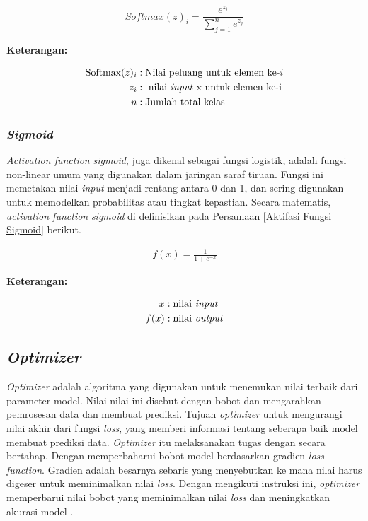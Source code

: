         \begin{equation}
            Softmax(z)_i= \frac{e^{z_i}}{\sum_{j=1}^{n} e^{z_j}}
        \end{equation}

     \textbf{Keterangan:}
        

        \begin{align*}
            \text{Softmax}(z)_i &: \text{Nilai peluang untuk elemen ke-}i \\
            z_i &: \text{ nilai \textit{input} x untuk elemen ke-i} \\
            n &: \text{Jumlah total kelas}
        \end{align*}
        



\subsubsection{\textit{Sigmoid}}
    \textit{Activation function} \textit{sigmoid}, juga dikenal sebagai fungsi logistik, adalah fungsi non-linear umum yang digunakan dalam jaringan saraf tiruan. Fungsi ini memetakan nilai \textit{input} menjadi rentang antara 0 dan 1, dan sering digunakan untuk memodelkan probabilitas atau tingkat kepastian. Secara matematis, \textit{activation function} \textit{sigmoid} di definisikan pada Persamaan  \ref{Aktifasi Fungsi Sigmoid} berikut.

    \begin{equation}
        \begin{aligned}
            f(x) = \frac{1}{1 + e^{-x}}
        \end{aligned}\label{Aktifasi Fungsi Sigmoid}
    \end{equation}

     \textbf{Keterangan:}
     
        \begin{align*}
        x & : \text{nilai \textit{input}} \\
        f(x) & :\text{nilai \textit{output}} 
        \end{align*}

        


\subsection{\textit{Optimizer}}

\textit{Optimizer} adalah algoritma yang digunakan untuk menemukan nilai terbaik dari parameter model. Nilai-nilai ini disebut dengan bobot dan mengarahkan pemrosesan data dan membuat prediksi. Tujuan \textit{optimizer} untuk mengurangi nilai akhir dari fungsi \textit{loss}, yang memberi informasi tentang seberapa baik model membuat prediksi data. \textit{Optimizer} itu melaksanakan tugas dengan secara bertahap. Dengan memperbaharui bobot model berdasarkan gradien \textit{loss function}. Gradien adalah besarnya sebaris yang menyebutkan ke mana nilai harus digeser untuk meminimalkan nilai \textit{loss}. Dengan mengikuti instruksi ini, \textit{optimizer} memperbarui nilai bobot yang meminimalkan nilai \textit{loss} dan meningkatkan akurasi model \cite{ruder2017overview}.




